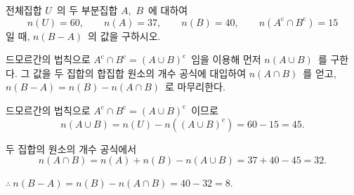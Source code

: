 \documentclass[10pt]{article}
\begin{document}

\newpage


\begin{dmproblem}
전체집합 $U$\ 의 두 부분집합 $A$,\ $B$\ 에 대하여
\begin{equation*}
  n(U) = 60, \qquad n(A) = 37, \qquad n(B) = 40, \qquad n(A^\mathrm{c} \cap B^\mathrm{c}) = 15
\end{equation*}
일 때, $n(B - A)$\ 의 값을 구하시오.
\end{dmproblem}

\begin{dmapproach}
드모르간의 법칙으로 $A^\mathrm{c} \cap B^\mathrm{c} = (A \cup B)^\mathrm{c}$\ 임을 이용해 먼저 $n(A \cup B)$\ 를 구한다. 그 값을 두 집합의 합집합 원소의 개수 공식에 대입하여 $n(A \cap B)$\ 를 얻고, $n(B - A) = n(B) - n(A \cap B)$\ 로 마무리한다.
\end{dmapproach}

\begin{dmsolution}
드모르간의 법칙으로 $A^\mathrm{c} \cap B^\mathrm{c} = (A \cup B)^\mathrm{c}$\ 이므로
\[ n(A \cup B) = n(U) - n((A \cup B)^\mathrm{c}) = 60 - 15 = 45. \]

두 집합의 원소의 개수 공식에서
\[ n(A \cap B) = n(A) + n(B) - n(A \cup B) = 37 + 40 - 45 = 32. \]

$\therefore\ n(B - A) = n(B) - n(A \cap B) = 40 - 32 = 8$.
\end{dmsolution}

\dmchecktitle


\end{document}

